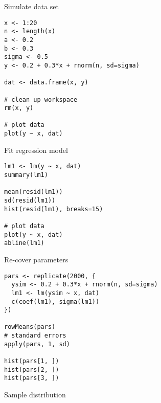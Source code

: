 \documentclass{beamer}
\begin{document}
{

\begin{frame}[fragile]{Simulate data set}
\begin{lstlisting}
x <- 1:20
n <- length(x)
a <- 0.2
b <- 0.3
sigma <- 0.5
y <- 0.2 + 0.3*x + rnorm(n, sd=sigma)

dat <- data.frame(x, y)

# clean up workspace
rm(x, y)

# plot data
plot(y ~ x, dat)
\end{lstlisting}
  \nocite{GelmanHill2020}
\end{frame}

\begin{frame}[fragile]{Fit regression model}
\begin{lstlisting}
lm1 <- lm(y ~ x, dat)
summary(lm1)

mean(resid(lm1))
sd(resid(lm1))
hist(resid(lm1), breaks=15)

# plot data
plot(y ~ x, dat)
abline(lm1)
\end{lstlisting}
\end{frame}

\begin{frame}[fragile]{Re-cover parameters}
\begin{lstlisting}
pars <- replicate(2000, {
  ysim <- 0.2 + 0.3*x + rnorm(n, sd=sigma)
  lm1 <- lm(ysim ~ x, dat)
  c(coef(lm1), sigma(lm1))
})

rowMeans(pars)
# standard errors
apply(pars, 1, sd)

hist(pars[1, ])
hist(pars[2, ])
hist(pars[3, ])
\end{lstlisting}
\end{frame}

}

\begin{frame}{Sample distribution}
  \begin{center}
  \end{center}
\end{frame}
\end{document}
